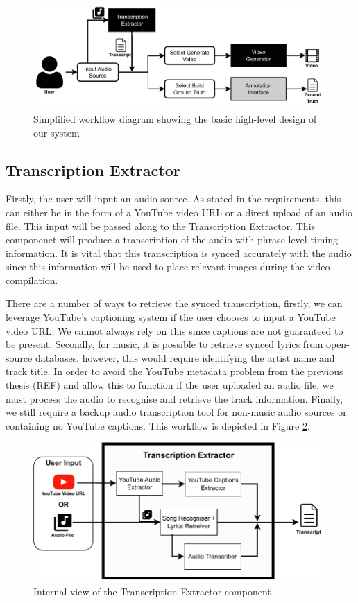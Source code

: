 \documentclass{l4proj}
\begin{document}
\begin{figure}[h]
    \centering
    \includegraphics[width=1\textwidth]{simplified_architecture.pdf}
    \caption{Simplified workflow diagram showing the basic high-level design of our system}
    \label{fig:simplified_workflow}
\end{figure}

\subsection{Transcription Extractor}
Firstly, the user will input an audio source. As stated in the requirements, this can either be in the form of a YouTube video URL or a direct upload of an audio file. This input will be passed along to the Transcription Extractor. This componenet will produce a transcription of the audio with phrase-level timing information. It is vital that this transcription is synced accurately with the audio since this information will be used to place relevant images during the video compilation.

There are a number of ways to retrieve the synced transcription, firstly, we can leverage YouTube's captioning system if the user chooses to input a YouTube video URL. We cannot always rely on this since captions are not guaranteed to be present. Secondly, for music, it is possible to retrieve synced lyrics from open-source databases, however, this would require identifying the artist name and track title. In order to avoid the YouTube metadata problem from the previous thesis (REF) and allow this to function if the user uploaded an audio file, we must process the audio to recognise and retrieve the track information. Finally, we still require a backup audio transcription tool for non-music audio sources or containing no YouTube captions. This workflow is depicted in Figure \ref{fig:transcription_extractor}.

\begin{figure}
    \centering
    \includegraphics[width=1\textwidth]{transcription_extractor.pdf}
    \caption{Internal view of the Transcription Extractor component}
    \label{fig:transcription_extractor}
\end{figure}
\end{document}
